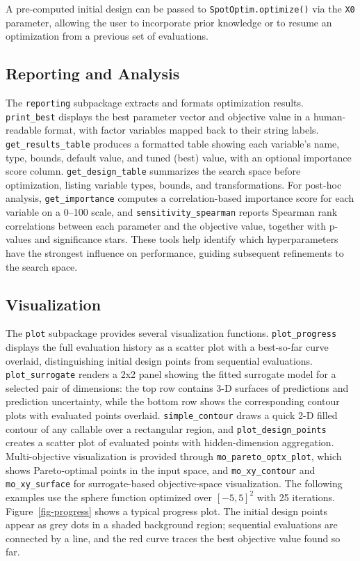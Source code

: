 \documentclass[
  twocolumn]{article}
\begin{document}
A pre-computed initial design can be passed to
\texttt{SpotOptim.optimize()} via the \texttt{X0} parameter, allowing
the user to incorporate prior knowledge or to resume an optimization
from a previous set of evaluations.

\subsection{Reporting and Analysis}\label{sec-reporting}

The \texttt{reporting} subpackage extracts and formats optimization
results. \texttt{print\_best} displays the best parameter vector and
objective value in a human-readable format, with factor variables mapped
back to their string labels. \texttt{get\_results\_table} produces a
formatted table showing each variable's name, type, bounds, default
value, and tuned (best) value, with an optional importance score column.
\texttt{get\_design\_table} summarizes the search space before
optimization, listing variable types, bounds, and transformations. For
post-hoc analysis, \texttt{get\_importance} computes a correlation-based
importance score for each variable on a 0--100 scale, and
\texttt{sensitivity\_spearman} reports Spearman rank correlations
between each parameter and the objective value, together with p-values
and significance stars. These tools help identify which hyperparameters
have the strongest influence on performance, guiding subsequent
refinements to the search space.

\subsection{Visualization}\label{sec-plotting}

The \texttt{plot} subpackage provides several visualization functions.
\texttt{plot\_progress} displays the full evaluation history as a
scatter plot with a best-so-far curve overlaid, distinguishing initial
design points from sequential evaluations. \texttt{plot\_surrogate}
renders a 2x2 panel showing the fitted surrogate model for a selected
pair of dimensions: the top row contains 3-D surfaces of predictions and
prediction uncertainty, while the bottom row shows the corresponding
contour plots with evaluated points overlaid. \texttt{simple\_contour}
draws a quick 2-D filled contour of any callable over a rectangular
region, and \texttt{plot\_design\_points} creates a scatter plot of
evaluated points with hidden-dimension aggregation. Multi-objective
visualization is provided through \texttt{mo\_pareto\_optx\_plot}, which
shows Pareto-optimal points in the input space, and
\texttt{mo\_xy\_contour} and \texttt{mo\_xy\_surface} for
surrogate-based objective-space visualization. The following examples
use the sphere function optimized over \([-5, 5]^2\) with 25 iterations.
Figure~\ref{fig-progress} shows a typical progress plot. The initial
design points appear as grey dots in a shaded background region;
sequential evaluations are connected by a line, and the red curve traces
the best objective value found so far.
\end{document}
